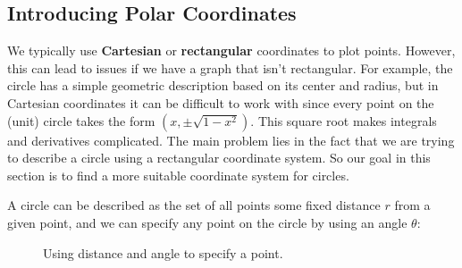 \documentclass[10pt,]{book}
\newcommand{\terminology}[1]{\textbf{#1}}
\theoremstyle{ptxplainnotitle}
\theoremstyle{ptxplaintitle}
\theoremstyle{ptxplainnotitle}
\theoremstyle{ptxplaintitle}
\theoremstyle{ptxplainnotitle}
\theoremstyle{ptxplaintitle}
\theoremstyle{ptxdefinitionnotitle}
\theoremstyle{ptxdefinitiontitle}
\theoremstyle{ptxdefinitionnotitle}
\theoremstyle{ptxdefinitiontitle}
\theoremstyle{ptxdefinitionnotitle}
\theoremstyle{ptxdefinitiontitle}
\theoremstyle{ptxdefinitionnotitle}
\theoremstyle{ptxdefinitiontitle}
\theoremstyle{ptxdefinitionnotitle}
\theoremstyle{ptxdefinitiontitle}
\numberwithin{equation}{section}
\begin{document}
\subsection[{Introducing Polar Coordinates}]{Introducing Polar Coordinates}\label{subsection-introducing-polar-coordinates}
\hypertarget{p-671}{}%
We typically use \terminology{Cartesian} or \terminology{rectangular} coordinates to plot points. However, this can lead to issues if we have a graph that isn't rectangular. For example, the circle has a simple geometric description based on its center and radius, but in Cartesian coordinates it can be difficult to work with since every point on the (unit) circle takes the form \((x,\pm\sqrt{1-x^{2}})\). This square root makes integrals and derivatives complicated. The main problem lies in the fact that we are trying to describe a circle using a rectangular coordinate system. So our goal in this section is to find a more suitable coordinate system for circles.%
\par
\hypertarget{p-672}{}%
A circle can be described as the set of all points some fixed distance \(r\) from a given point, and we can specify any point on the circle by using an angle \(\theta\):%
\begin{figure}
\centering
{
}
\caption{Using distance and angle to specify a point.\label{figure-polar-coords}}
\end{figure}
\end{document}
